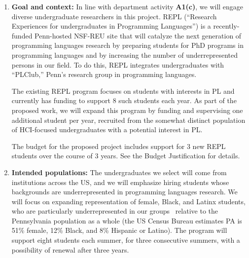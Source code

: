 \begin{enumerate}
\item {\bf Goal and context:} In line with department activity \textbf{A1(c)},
we will engage diverse undergraduate researchers in this project.
REPL (``Research Experiences for
undergraduates in Programming Languages'') is a recently-funded
Penn-hosted NSF-REU site that will catalyze the next generation of
programming languages research by preparing students for PhD programs
in programming languages and by increasing the number of
underrepresented persons in our field. To do this, REPL integrates
undergraduates with ``PLClub,'' Penn’s research group in programming
languages.

The existing REPL program focuses on students with interests in PL and
currently has funding to support 8 such students each year.  As part
of the proposed work, we will expand this program by funding and
supervising one additional student per year, recruited from the
somewhat distinct population of HCI-focused undergraduates with a
potential interest in PL.

The budget for the proposed project includes support for 3 new REPL
students over the course of 3 years.  See the Budget Justification for
details.

\item {\bf Intended populations:} The undergraduates we select will
come from institutions across the US, and we will emphasize hiring
students whose backgrounds are underrepresented in programming
languages research.
%
%
We will focus on expanding representation of
female, Black, and Latinx students, who are particularly
underrepresented in our
groups~\cite{taulbee2019} relative to the Pennsylvania population as a
whole (the US Census Bureau
estimates PA is 51\% female, 12\% Black, and 8\% Hispanic or Latino).  The
program will support eight students each
summer, for three consecutive summers, with a possibility of renewal
after three years.


\end{enumerate}
